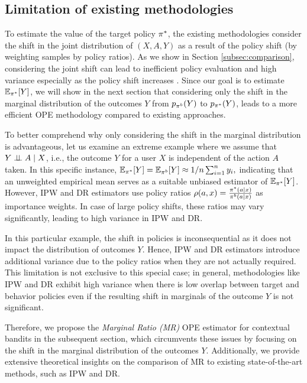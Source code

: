 \subsection{Limitation of existing methodologies} 
To estimate the value of the target policy $\pi^*$, the existing methodologies consider the shift in the joint distribution of $(X, A, Y)$  as a result of the policy shift (by weighting samples by policy ratios). As we show in Section \ref{subsec:comparison}, considering the joint shift can lead to inefficient policy evaluation and high variance especially as the policy shift increases \citep{li2018addressing}.
Since our goal is to estimate $\mathbb{E}_{\pi^*}[Y]$, we will show in the next section that considering only the shift in the marginal distribution of the outcomes $Y$ from $p_{\pi^b}(Y)$ to $p_{\pi^*}(Y)$, leads to a more efficient OPE methodology compared to existing approaches.

To better comprehend why only considering the shift in the marginal distribution is advantageous, let us examine an extreme example where we assume that $Y \perp \!\!\! \perp A \mid X$, i.e., the outcome $Y$ for a user $X$ is independent of the action $A$ taken. In this specific instance, $\mathbb{E}_{\pi^*}[Y] = \mathbb{E}_{\pi^b}[Y] \approx 1/n\sum_{i=1}^n y_i,$ indicating that an unweighted empirical mean serves as a suitable unbiased estimator of $\mathbb{E}_{\pi^*}[Y]$. However, IPW and DR estimators use policy ratios $\rho(a, x)  = \frac{\pi^*(a \mid x)}{\pi^b(a \mid x)}$ as importance weights. In case of large policy shifts, these ratios may vary significantly, leading to high variance in IPW and DR.

In this particular example, the shift in policies is inconsequential as it does not impact the distribution of outcomes $Y$. Hence, IPW and DR estimators introduce additional variance due to the policy ratios when they are not actually required. This limitation is not exclusive to this special case; in general, methodologies like IPW and DR exhibit high variance when there is low overlap between target and behavior policies \citep{li2018addressing} even if the resulting shift in marginals of the outcome $Y$ is not significant.

Therefore, we propose the \emph{Marginal Ratio (MR)} OPE estimator for contextual bandits in the subsequent section, which circumvents these issues by focusing on the shift in the marginal distribution of the outcomes $Y$. Additionally, we provide extensive theoretical insights on the comparison of MR to existing state-of-the-art methods, such as IPW and DR.


